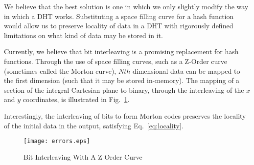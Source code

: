 \documentclass[12pt]{IEEEtran}
\begin{document}
\par We believe that the best solution is one in which we only slightly modify the way in which a DHT works. Substituting a space filling curve for a hash function would allow us to preserve locality of data in a DHT with rigorously defined limitations on what kind of data may be stored in it.

\par Currently, we believe that bit interleaving is a promising replacement for hash functions. Through the use of space filling curves, such as a Z-Order curve (sometimes called the Morton curve), $Nth$-dimensional data can be mapped to the first dimension (such that it may be stored in-memory). The mapping of a section of the integral Cartesian plane to binary, through the interleaving of the $x$ and $y$ coordinates, is illustrated in Fig.~\ref{fig_ZOrd}.

\par Interestingly, the interleaving of bits to form Morton codes preserves the locality of the initial data in the output, satisfying Eq.~\ref{eq:locality}.


\begin{figure}[!t]
\centering
\texttt{[image: errors.eps]}
\caption{Bit Interleaving With A Z Order Curve}
\label{fig_ZOrd}
\end{figure}


\printbibliography
\end{document}
